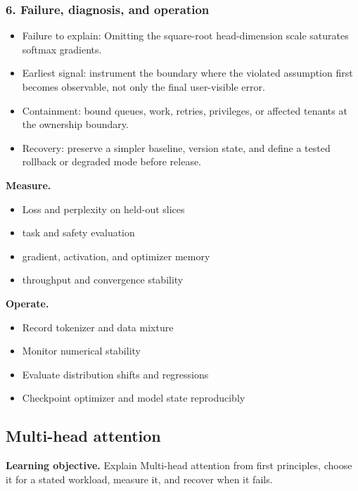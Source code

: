 \subsubsection*{6. Failure, diagnosis, and operation}
\begin{itemize}
\item Failure to explain: Omitting the square-root head-dimension scale saturates softmax gradients.
\item Earliest signal: instrument the boundary where the violated assumption first becomes observable, not only the final user-visible error.
\item Containment: bound queues, work, retries, privileges, or affected tenants at the ownership boundary.
\item Recovery: preserve a simpler baseline, version state, and define a tested rollback or degraded mode before release.
\end{itemize}
\textbf{Measure.}\begin{itemize}
\item Loss and perplexity on held-out slices
\item task and safety evaluation
\item gradient, activation, and optimizer memory
\item throughput and convergence stability
\end{itemize}
\textbf{Operate.}\begin{itemize}
\item Record tokenizer and data mixture
\item Monitor numerical stability
\item Evaluate distribution shifts and regressions
\item Checkpoint optimizer and model state reproducibly
\end{itemize}
\subsection{Multi-head attention}
\textbf{Learning objective.} Explain Multi-head attention from first principles, choose it for a stated workload, measure it, and recover when it fails.
